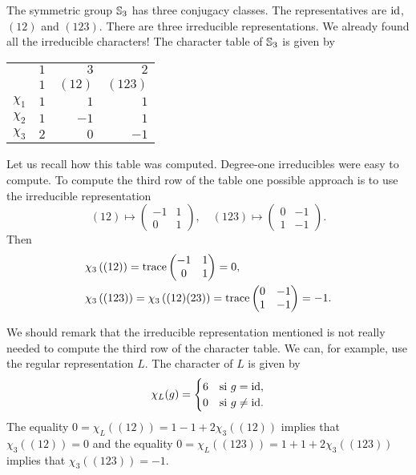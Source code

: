 \begin{example}
	The symmetric group $\mathbb{S}_3$ has three conjugacy classes. The representatives are 
	$\operatorname{id}$, $(12)$ and $(123)$. There are three irreducible representations. We already found all the irreducible characters! 
	The character table of $\mathbb{S}_3$ is given by 
	\begin{center}
		\begin{tabular}{|c|rrr|}
			\hline
			& $1$ & $3$ & $2$\tabularnewline
			& $1$ & $(12)$ & $(123)$ \tabularnewline
			\hline 
			$\chi_{1}$ & $1$ & $1$ & $1$\tabularnewline
			$\chi_{2}$ & $1$ & $-1$ & $1$ \tabularnewline
			$\chi_{3}$ & $2$ & $0$ & $-1$ \tabularnewline
			\hline
		\end{tabular}
	\end{center}
	Let us recall how this table was computed. Degree-one irreducibles were easy to compute. 
	To compute the third row of the table one possible approach is to use
	the irreducible representation  
	\[
	(12)\mapsto \begin{pmatrix}-1&1\\0&1\end{pmatrix},
	\quad
	(123)\mapsto \begin{pmatrix}0&-1\\1&-1\end{pmatrix}.
	\]
    Then	
    \begin{align*}
		&\chi_3\left( (12) \right)=\operatorname{trace}\begin{pmatrix}-1&1\\0&1\end{pmatrix}=0,\\
		&\chi_3\left( (123) \right)=\chi_3\left( (12)(23)\right)=\operatorname{trace}\begin{pmatrix}0&-1\\1&-1\end{pmatrix}=-1.
	\end{align*}

	We should remark that the irreducible representation mentioned is not really needed to
	compute the third row of the character table. We can, for example, use the regular
	representation $L$. The character of $L$ is given by 
	\[
		\chi_L(g)=\begin{cases}
			6 & \text{si $g=\operatorname{id}$},\\
			0 & \text{si $g\ne\operatorname{id}$}.
		\end{cases}
	\]
	The equality $0=\chi_L\left( (12) \right)=1-1+2\chi_3( (12))$ implies that 
	$\chi_3( (12))=0$ and the equality $0=\chi_L( (123))=1+1+2\chi_3( (123))$
	implies that $\chi_3\left( (123) \right)=-1$. 


\end{example}
